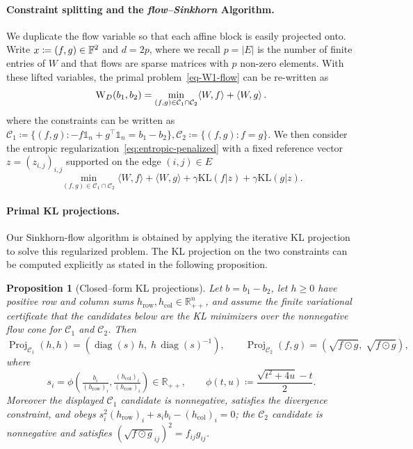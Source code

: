 \documentclass{article}
\newcommand{\dotp}[2]{\langle #1,#2 \rangle}
\theoremstyle{plain}
\newtheorem{proposition}{Proposition}[section]
\newcommand{\ones}{\mathds{1}}
\newcommand{\Edge}{E}
\newcommand{\length}{W}
\newcommand{\eqdef}{\coloneqq}
\newcommand{\RR}{\mathbb{R}}
\newcommand{\Cc}{\mathcal{C}}
\DeclareMathOperator{\Proj}{Proj}
\DeclareMathOperator{\diag}{diag}
\newcommand{\z}{z}
\newcommand{\KLdiv}[2]{\mathrm{KL}(#1|#2)}
\begin{document}
\paragraph{Constraint splitting and the \textit{flow--Sinkhorn} Algorithm.}
\label{subsec-splitting-constr}

We duplicate the flow variable so that each affine block is easily projected onto. Write $x \eqdef (f,g) \in\Flows^{2}$ and $d = 2p$, where we recall $p=|\Edge|$ is the number of finite entries of $\length$ and that flows are sparse matrices with $p$ non-zero elements.  
%
With these lifted variables, the primal problem~\eqref{eq-W1-flow} can be re-written as 
\begin{equation}
	\label{eq-W1-flow-lifted}
	\mathrm W_{\Geod}(b_1,b_2)
	=
	\min_{(f,g) \in \Cc_{1} \cap \Cc_{2}} \dotp{\length}{f} + \dotp{\length}{g}\,. 
\end{equation}
where the constraints can be written as
$
	\Cc_{1} \eqdef \{(f,g): -f\ones_{n}+g^{\!\top}\ones_{n}=b_1-b_2\}, 
	\Cc_{2} \eqdef \{(f,g):f=g\}.
$
We then consider the entropic regularization~\eqref{eq:entropic-penalized} with a fixed reference vector $\z=(\z_{i,j})_{i,j}$ supported on the edge $(i,j) \in \Edge$
$$
		\min_{(f,g) \in \Cc_{1} \cap \Cc_{2}} \dotp{\length}{f} + \dotp{\length}{g} + \gamma \KLdiv{f}{\z}+ \gamma \KLdiv{g}{\z}.
$$

\paragraph{Primal KL projections.}

Our Sinkhorn-flow algorithm is obtained by applying the iterative KL projection to solve this regularized problem.
%
The KL projection on the two constraints can be computed explicitly as stated in the following proposition. 

\begin{proposition}[Closed--form KL projections]
\label{prop:graphw1-projection-closed-form}
Let $b=b_1-b_2$, let $h\ge0$ have positive row and column sums
$h_{\mathrm{row}},h_{\mathrm{col}}\in\RR^n_{++}$, and assume the finite variational certificate that the candidates below are the KL minimizers over the nonnegative flow cone for $\Cc_1$ and $\Cc_2$.
Then
\[
	\Proj_{\Cc_{1}}(h,h) =(\diag(s)\,h,\;h\,\diag(s)^{-1}), \qquad
	\Proj_{\Cc_{2}}( f, g) =(\sqrt{ f\odot  g},\;\sqrt{ f\odot  g}),
\]
where
\[
s_i
	 =
	\phi\!\left(
		\tfrac{b_i}{(h_{\mathrm{row}})_i},
		\tfrac{(h_{\mathrm{col}})_i}{(h_{\mathrm{row}})_i}
	\right) \in\RR_{++},
	\qquad
\phi(t,u)\eqdef \frac{\sqrt{t^{2}+4u}-t}{2}.
\]
Moreover the displayed $\Cc_1$ candidate is nonnegative, satisfies the divergence constraint, and obeys
$s_i^2(h_{\mathrm{row}})_i+s_i b_i-(h_{\mathrm{col}})_i=0$; the $\Cc_2$ candidate is nonnegative and satisfies
$(\sqrt{f\odot g}_{ij})^2=f_{ij}g_{ij}$.
\end{proposition}
\end{document}

